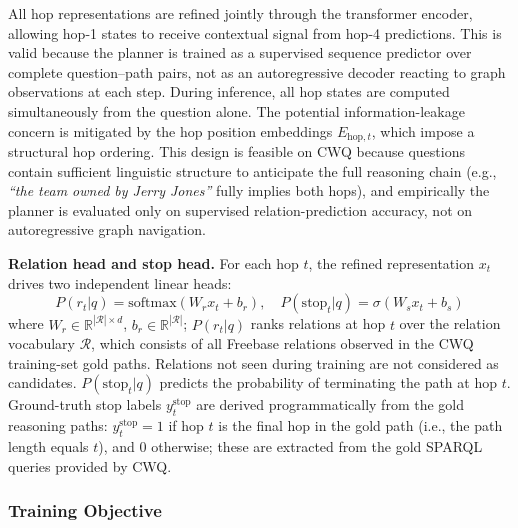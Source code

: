 \documentclass[10pt,conference]{IEEEtran}
\begin{document}
All hop representations are refined jointly through the transformer encoder, allowing hop-1 states to receive contextual signal from hop-4 predictions. This is valid because the planner is trained as a supervised sequence predictor over complete question--path pairs, not as an autoregressive decoder reacting to graph observations at each step. During inference, all hop states are computed simultaneously from the question alone. The potential information-leakage concern is mitigated by the hop position embeddings $E_{\text{hop},t}$, which impose a structural hop ordering. This design is feasible on CWQ because questions contain sufficient linguistic structure to anticipate the full reasoning chain (e.g., \textit{``the team owned by Jerry Jones''} fully implies both hops), and empirically the planner is evaluated only on supervised relation-prediction accuracy, not on autoregressive graph navigation.

\textbf{Relation head and stop head.} For each hop $t$, the refined representation $x_t$ drives two independent linear heads:
\begin{equation}
P(r_t|q) = \text{softmax}(W_r x_t + b_r), \quad P(\text{stop}_t|q) = \sigma(W_s x_t + b_s)
\end{equation}
where $W_r \in \mathbb{R}^{|\mathcal{R}| \times d}$, $b_r \in \mathbb{R}^{|\mathcal{R}|}$; $P(r_t|q)$ ranks relations at hop $t$ over the relation vocabulary $\mathcal{R}$, which consists of all Freebase relations observed in the CWQ training-set gold paths. Relations not seen during training are not considered as candidates. $P(\text{stop}_t|q)$ predicts the probability of terminating the path at hop $t$. Ground-truth stop labels $y^{\text{stop}}_t$ are derived programmatically from the gold reasoning paths: $y^{\text{stop}}_t = 1$ if hop $t$ is the final hop in the gold path (i.e., the path length equals $t$), and $0$ otherwise; these are extracted from the gold SPARQL queries provided by CWQ.

\subsubsection{Training Objective}
\end{document}
